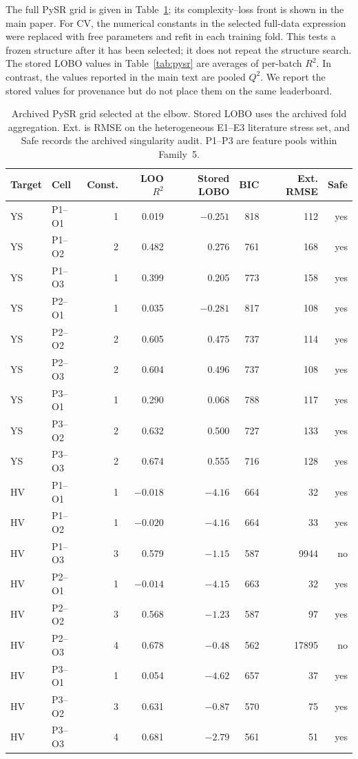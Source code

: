\documentclass[a4paper,11pt]{article}
\begin{document}
The full PySR grid is given in Table~\ref{tab:pysrgrid}; its complexity--loss front is shown in the main paper. For CV, the numerical constants in the selected full-data expression were replaced with free parameters and refit in each training fold. This tests a frozen structure after it has been selected; it does not repeat the structure search. The stored LOBO values in Table~\ref{tab:pysr} are averages of per-batch $R^2$. In contrast, the values reported in the main text are pooled $Q^2$. We report the stored values for provenance but do not place them on the same leaderboard.

\begin{table}[H]
\centering
\caption{Archived PySR grid selected at the elbow. Stored LOBO uses the archived fold aggregation. Ext. is RMSE on the heterogeneous E1--E3 literature stress set, and Safe records the archived singularity audit. P1--P3 are feature pools within Family~5.}
\label{tab:pysrgrid}
\footnotesize
\setlength{\tabcolsep}{3.5pt}
\begin{tabular}{llrrrrrr}
\toprule
Target & Cell & Const. & LOO $R^2$ & Stored LOBO & BIC & Ext. RMSE & Safe \\
\midrule
YS & P1--O1 & 1 & 0.019 & $-0.251$ & 818 & 112 & yes \\
YS & P1--O2 & 2 & 0.482 & 0.276 & 761 & 168 & yes \\
YS & P1--O3 & 1 & 0.399 & 0.205 & 773 & 158 & yes \\
YS & P2--O1 & 1 & 0.035 & $-0.281$ & 817 & 108 & yes \\
YS & P2--O2 & 2 & 0.605 & 0.475 & 737 & 114 & yes \\
YS & P2--O3 & 2 & 0.604 & 0.496 & 737 & 108 & yes \\
YS & P3--O1 & 1 & 0.290 & 0.068 & 788 & 117 & yes \\
YS & P3--O2 & 2 & 0.632 & 0.500 & 727 & 133 & yes \\
YS & P3--O3 & 2 & 0.674 & 0.555 & 716 & 128 & yes \\
\midrule
HV & P1--O1 & 1 & $-0.018$ & $-4.16$ & 664 & 32 & yes \\
HV & P1--O2 & 1 & $-0.020$ & $-4.16$ & 664 & 33 & yes \\
HV & P1--O3 & 3 & 0.579 & $-1.15$ & 587 & 9944 & no \\
HV & P2--O1 & 1 & $-0.014$ & $-4.15$ & 663 & 32 & yes \\
HV & P2--O2 & 3 & 0.568 & $-1.23$ & 587 & 97 & yes \\
HV & P2--O3 & 4 & 0.678 & $-0.48$ & 562 & 17895 & no \\
HV & P3--O1 & 1 & 0.054 & $-4.62$ & 657 & 37 & yes \\
HV & P3--O2 & 3 & 0.631 & $-0.87$ & 570 & 75 & yes \\
HV & P3--O3 & 4 & 0.681 & $-2.79$ & 561 & 51 & yes \\
\bottomrule
\end{tabular}
\end{table}
\end{document}
